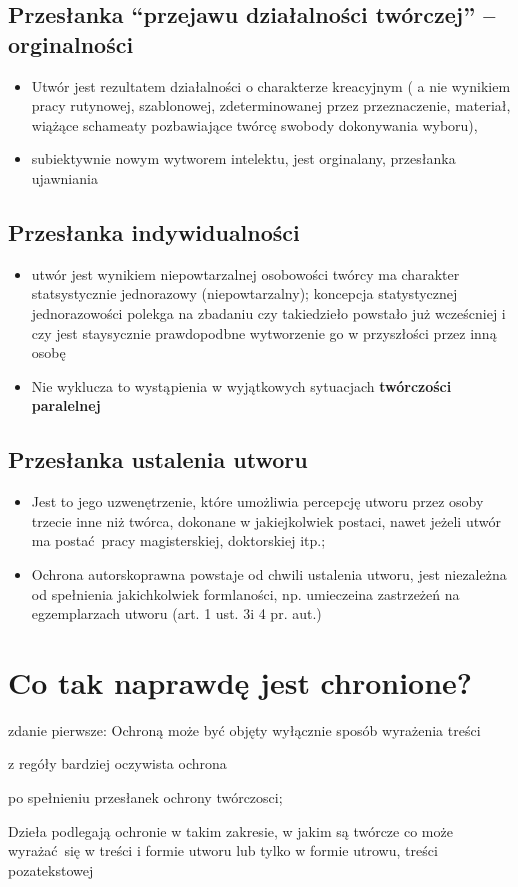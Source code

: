 \documentclass[11pt]{article}
\begin{document}
\subsection{Przesłanka ``przejawu działalności twórczej'' -- orginalności}
\label{sec:org4a6664c}
\begin{itemize}
\item Utwór jest rezultatem działalności o charakterze kreacyjnym ( a nie wynikiem pracy rutynowej, szablonowej, zdeterminowanej przez przeznaczenie, materiał, wiążące schameaty pozbawiające twórcę swobody dokonywania wyboru),
\item subiektywnie nowym wytworem intelektu, jest orginalany, przesłanka ujawniania
\end{itemize}
\subsection{Przesłanka indywidualności}
\label{sec:orgbcd924f}
\begin{itemize}
\item utwór jest wynikiem niepowtarzalnej osobowości twórcy ma charakter statsystycznie jednorazowy (niepowtarzalny); koncepcja statystycznej jednorazowości polekga na zbadaniu czy takiedzieło powstało już wcześcniej i czy jest staysycznie prawdopodbne wytworzenie go w przyszłości przez inną osobę
\item Nie wyklucza to wystąpienia w wyjątkowych sytuacjach \textbf{twórczości paralelnej}
\end{itemize}
\subsection{Przesłanka ustalenia utworu}
\label{sec:org70855bb}
\begin{itemize}
\item Jest to jego uzwenętrzenie, które umożliwia percepcję utworu przez osoby trzecie inne niż twórca, dokonane w jakiejkolwiek postaci, nawet jeżeli utwór ma postać pracy magisterskiej, doktorskiej itp.;
\item Ochrona autorskoprawna powstaje od chwili ustalenia utworu, jest niezależna od spełnienia jakichkolwiek formlaności, np. umieczeina zastrzeżeń na egzemplarzach utworu (art. 1 ust. 3i 4 pr. aut.)
\end{itemize}
\section{Co tak naprawdę jest chronione?}
\label{sec:org80f2455}
\begin{description}
\item[{Art. 1 ust. 2'}] zdanie pierwsze: Ochroną może być objęty wyłącznie sposób wyrażenia treści
\item[{Forma --}] z regóły bardziej oczywista ochrona
\item[{Treść --}] po spełnieniu przesłanek ochrony twórczosci;
\item Dzieła podlegają ochronie w takim zakresie, w jakim są twórcze co może wyrażać się w treści i formie utworu lub tylko w formie utrowu, treści pozatekstowej
\end{description}
\end{document}
